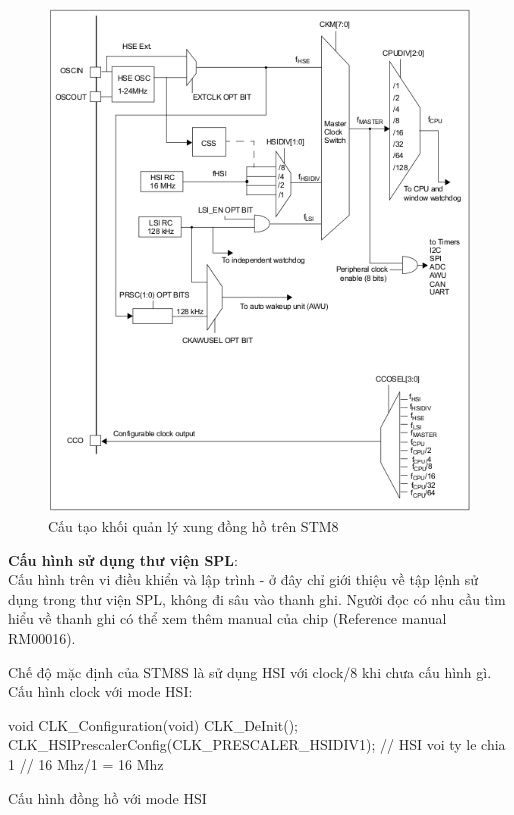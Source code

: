 \begin{figure}[ht]
\centering
\includegraphics[scale=0.5]{images/clock_tree.png}
\caption{Cấu tạo khối quản lý xung đồng hồ trên STM8}
\end{figure}

\textbf{Cấu hình sử dụng thư viện SPL}:\\
Cấu hình trên vi điều khiển và lập trình - ở đây chỉ giới thiệu về tập lệnh sử dụng trong thư viện SPL, không đi sâu vào thanh ghi.
Người đọc có nhu cầu tìm hiểu về thanh ghi có thể xem thêm manual của chip (Reference manual RM00016).

Chế độ mặc định của STM8S là sử dụng HSI với clock/8 khi chưa cấu hình gì.
Cấu hình clock với mode HSI:
\begin{listing}
\begin{ccode}
void CLK_Configuration(void)
{
    CLK_DeInit();
    CLK_HSIPrescalerConfig(CLK_PRESCALER_HSIDIV1); // HSI voi ty le chia 1
    // 16 Mhz/1 = 16 Mhz
}
\end{ccode}
\caption{Cấu hình đồng hồ với mode HSI}
\end{listing}

